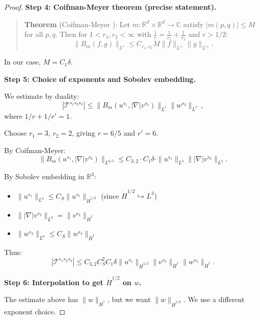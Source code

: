 \documentclass[11pt]{article}
\theoremstyle{definition}
\newcommand{\R}{\mathbb{R}}
\newcommand{\C}{\mathbb{C}}
\begin{document}
\begin{proof}
\textbf{Step 4: Coifman-Meyer theorem (precise statement).}

\begin{quote}
\textbf{Theorem} (Coifman-Meyer \cite{CM}): Let $m: \R^d \times \R^d \to \C$ satisfy $|m(p,q)| \leq M$ for all $p, q$. Then for $1 < r_1, r_2 < \infty$ with $\frac{1}{r} = \frac{1}{r_1} + \frac{1}{r_2}$ and $r > 1/2$:
\begin{equation}
\|B_m(f,g)\|_{L^r} \leq C_{r_1, r_2} M \|f\|_{L^{r_1}} \|g\|_{L^{r_2}}.
\end{equation}
\end{quote}

In our case, $M = C_1 \delta$.

\textbf{Step 5: Choice of exponents and Sobolev embedding.}

We estimate by duality:
\begin{equation}
|\mathcal{T}^{s_1 s_2 s_3}| \leq \|B_m(u^{s_1}, |\nabla|v^{s_2})\|_{L^r} \|w^{s_3}\|_{L^{r'}},
\end{equation}
where $1/r + 1/r' = 1$.

Choose $r_1 = 3$, $r_2 = 2$, giving $r = 6/5$ and $r' = 6$.

By Coifman-Meyer:
\begin{equation}
\|B_m(u^{s_1}, |\nabla|v^{s_2})\|_{L^{6/5}} \leq C_{3,2} \cdot C_1 \delta \cdot \|u^{s_1}\|_{L^3} \||\nabla|v^{s_2}\|_{L^2}.
\end{equation}

By Sobolev embedding in $\R^3$:
\begin{itemize}
\item $\|u^{s_1}\|_{L^3} \leq C_S \|u^{s_1}\|_{\dot{H}^{1/2}}$ (since $\dot{H}^{1/2} \hookrightarrow L^3$)
\item $\||\nabla|v^{s_2}\|_{L^2} = \|v^{s_2}\|_{\dot{H}^1}$
\item $\|w^{s_3}\|_{L^6} \leq C_S \|w^{s_3}\|_{\dot{H}^1}$
\end{itemize}

Thus:
\begin{equation}
|\mathcal{T}^{s_1 s_2 s_3}| \leq C_{3,2} C_S^2 C_1 \delta \|u^{s_1}\|_{\dot{H}^{1/2}} \|v^{s_2}\|_{\dot{H}^1} \|w^{s_3}\|_{\dot{H}^1}.
\end{equation}

\textbf{Step 6: Interpolation to get $\dot{H}^{1/2}$ on $w$.}

The estimate above has $\|w\|_{\dot{H}^1}$, but we want $\|w\|_{\dot{H}^{1/2}}$. We use a different exponent choice.


\end{proof}
\end{document}
